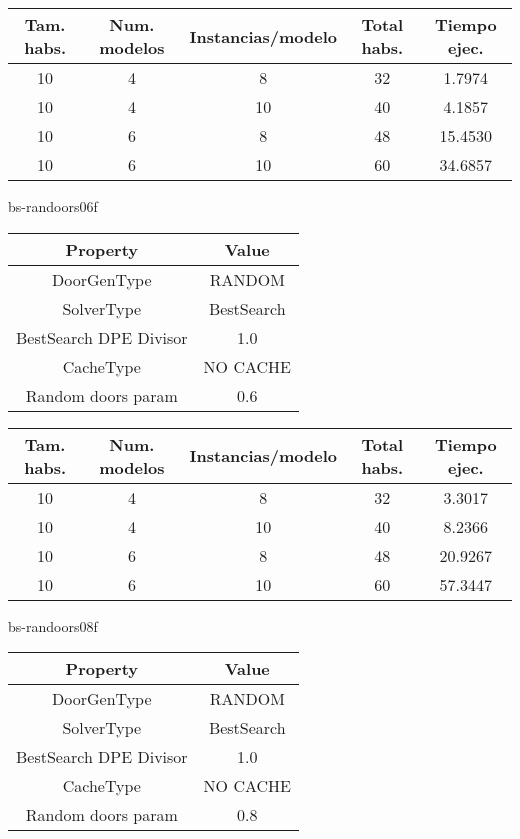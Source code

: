 \begin{center}
	\begin{tabular}{ | c | c | c | c | c | }
\hline
Tam. habs. & Num. modelos & Instancias/modelo & Total habs. & Tiempo ejec. \\ \hline 
10 & 4 & 8 & 32 & 1.7974 \\ 
10 & 4 & 10 & 40 & 4.1857 \\ 
10 & 6 & 8 & 48 & 15.4530 \\ 
10 & 6 & 10 & 60 & 34.6857 \\ 
\hline
	\end{tabular}
\end{center}

bs-randoors06f
\begin{center}
	\begin{tabular}{ | c | c | }
\hline
 		Property & Value \\ \hline
DoorGenType & RANDOM \\ 
SolverType & BestSearch \\ 
BestSearch DPE Divisor & 1.0 \\ 
CacheType & NO CACHE \\ 
Random doors param & 0.6 \\ 
\hline
	\end{tabular}
\end{center}

\begin{center}
	\begin{tabular}{ | c | c | c | c | c | }
\hline
Tam. habs. & Num. modelos & Instancias/modelo & Total habs. & Tiempo ejec. \\ \hline 
10 & 4 & 8 & 32 & 3.3017 \\ 
10 & 4 & 10 & 40 & 8.2366 \\ 
10 & 6 & 8 & 48 & 20.9267 \\ 
10 & 6 & 10 & 60 & 57.3447 \\ 
\hline
	\end{tabular}
\end{center}

bs-randoors08f
\begin{center}
	\begin{tabular}{ | c | c | }
\hline
 		Property & Value \\ \hline
DoorGenType & RANDOM \\ 
SolverType & BestSearch \\ 
BestSearch DPE Divisor & 1.0 \\ 
CacheType & NO CACHE \\ 
Random doors param & 0.8 \\ 
\hline
	\end{tabular}
\end{center}

